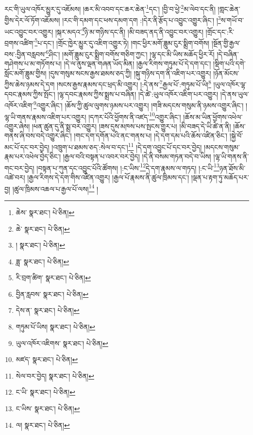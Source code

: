 རང་གི་ཡུལ་འཁོར་མྱུར་དུ་འཇོམས། །ཆར་མི་འབབ་དང་ཆར་ཆེན་\footnote{ཆེས་  སྣར་ཐང་།  པེ་ཅིན། }དང་། །བྱི་བ་ཕྱེ་\footnote{ཆེ་  སྣར་ཐང་།  པེ་ཅིན། }མ་ལེབ་དང་ནི། །གླང་ཆེན་གྱིས་དེར་ལོ་ཏོག་འཇོམས། །རང་གི་དམག་དང་ཕས་དམག་དག :།དེར་ནི་རྩོད་པ་འབྱུང་འགྱུར་ཞིང་། །\footnote{།  སྣར་ཐང་།  པེ་ཅིན། }ས་གཡོ་བ་ཡང་འབྱུང་བར་འགྱུར། །སྐར་མདའ་\footnote{ཟླ་  སྣར་ཐང་།  པེ་ཅིན། }ཉི་མ་གཉིས་དང་ནི། །མི་བཟད་ནད་ནི་འབྱུང་བར་འགྱུར། །གྲོང་དང་:རི་བྲགས་འཚིག་\footnote{རི་བྲག་ཚིག་  སྣར་ཐང་།  པེ་ཅིན། }པ་དང་། །གྲོང་ཁྱེར་མྱུར་དུ་འཇིག་འགྱུར་ཏེ། །གང་ཕྱིར་མགོ་ཟླུམ་ངུར་སྨྲིག་བགོས། །སྔོན་གྱི་རྒྱལ་བས་:བྱིན་བརླབས་\footnote{བྱིན་རླབས་  སྣར་ཐང་།  པེ་ཅིན། }ཤིང་། །མགོ་ཟླུམ་ངུར་སྨྲིག་བགོས་གཅིག་ཀྱང་། །ལྷ་དང་མི་ཡིས་མཆོད་ཕྱིར་རོ། །དེ་བཞིན་གཤེགས་པ་མ་གཏོགས་པ། །དེ་ལ་ནུས་ལྡན་གཞན་ཡོད་མིན། །རྒྱལ་རིགས་གཏུམ་པོ་དེ་དག་དང་། །སྡིག་པའི་དགེ་སློང་མགོ་ཟླུམ་གྱིས། །དུས་གསུམ་སངས་རྒྱས་ཐམས་ཅད་ཀྱི། །སྐུ་གཉིས་དག་ནི་འཇིག་པར་འགྱུར། །ཉོན་མོངས་ཀྱིས་ཆེས་ཉམས་དེ་དག །སངས་རྒྱས་རྣམས་དང་ཕྲད་མི་འགྱུར། །:དེ་ནས་\footnote{དེས་ན་  སྣར་ཐང་།  པེ་ཅིན། }རྒྱལ་པོ་:གཏུམ་པོ་ཡི།\footnote{གཏུམ་པོ་ཡིས།  སྣར་ཐང་།  པེ་ཅིན། } །ཡུལ་འཁོར་ལྷ་དབང་རྣམས་ཀྱིས་སྤོང་། །ལྷ་དབང་རྣམས་ཀྱིས་སྨྲས་པ་བཞིན། །དེ་ཚེ་:ཡུལ་འཁོར་འཇིག་པར་འགྱུར། །དེ་ནས་ཡུལ་འཁོར་འཇིག་\footnote{ཡུལ་འཁོར་འཇིགས་  སྣར་ཐང་།  པེ་ཅིན། }འགྱུར་ཞིང་། །ཆོས་ཀྱི་ཚུལ་ལུགས་ཉམས་པར་འགྱུར། །གཟི་མདངས་གསུམ་ནི་ཉམས་འགྱུར་ཞིང་། །ལྷ་ཡི་གནས་རྣམས་འཇིག་པར་འགྱུར། །དཀར་པོའི་ཕྱོགས་ནི་འཛད་\footnote{མཛད་  སྣར་ཐང་།  པེ་ཅིན། }འགྱུར་ཞིང་། །ཆོས་མ་ཡིན་ཕྱོགས་འཕེལ་འགྱུར་ཞེས། །ཕན་ཚུན་དུ་ནི་སྨྲ་བར་འགྱུར། །ཟས་དུས་མཁས་པས་སྤངས་གྱུར་པ། །མི་བཟད་དེ་ཡི་ཚེ་ན་ནི། །ཆོས་གནས་ཞི་བས་བདེ་འགྱུར་ཞིང་། །གང་དག་དགོན་པའི་ནང་གནས་པ། །དེ་དག་དམ་པའི་ཆོས་འཛིན་ཅིང་། །སྐྱེ་བོ་མང་པོ་དང་བར་བྱེད། །འཁྲུག་པ་ཐམས་ཅད་:སེལ་བ་དང་།\footnote{སེལ་བར་བྱེད།  སྣར་ཐང་།  པེ་ཅིན། } །དེ་དག་འབྱུང་པོ་དང་བར་བྱེད། །མདངས་གསུམ་རྣམ་པར་འཕེལ་བྱེད་ཅིང་། །རྒྱལ་བའི་བསྟན་པ་འབར་བར་བྱེད། །དེ་ནི་བསམ་གཏན་བདེ་བ་ཡིས། །ལྷ་ཡི་གནས་ནི་གང་བར་བྱེད། །བསྟན་པ་ཀུན་དང་འབྱུང་པོའི་ཚོགས། །:ང་ཡིས་\footnote{ང་ཡི་  སྣར་ཐང་།  པེ་ཅིན། }དེ་དག་རྣམས་ལ་གཏད། །:ང་ཡི་\footnote{ང་ཡིས་  སྣར་ཐང་།  པེ་ཅིན། }ཉན་ཐོས་མི་འཚེ་བར། །རྒྱལ་རིགས་དེ་དག་གིས་འཛིན་འགྱུར། །རྒྱལ་པོ་རྣམས་ནི་ཚུལ་ཁྲིམས་དང་། །ལྡན་པ་རྟག་ཏུ་མཆོད་པར་བྱ། །ཚུལ་ཁྲིམས་འཆལ་པ་རྒྱལ་པོ་ལས།\footnote{ལ།  སྣར་ཐང་།  པེ་ཅིན། } །
